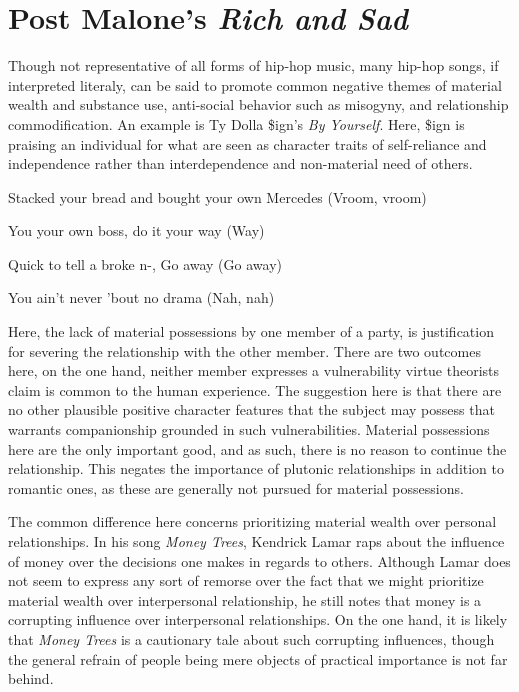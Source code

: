 \documentclass[phdthesis,12pt,final]{wuthesis}
\theoremstyle{definition}
\theoremstyle{definition}
\theoremstyle{definition}
\theoremstyle{definition}
\theoremstyle{remark}
\begin{document}
\section{\texorpdfstring{Post Malone's \emph{Rich and Sad}}{Post Malone's Rich and Sad}}\label{post-malones-rich-and-sad}

Though not representative of all forms of hip-hop music, many hip-hop songs, if interpreted literaly, can be said to promote common negative themes of material wealth and substance use, anti-social behavior such as misogyny, and relationship commodification. An example is Ty Dolla \$ign's \emph{By Yourself}. Here, \$ign is praising an individual for what are seen as character traits of self-reliance and independence rather than interdependence and non-material need of others.

Stacked your bread and bought your own Mercedes (Vroom, vroom)

You your own boss, do it your way (Way)

Quick to tell a broke n-, Go away (Go away)

You ain't never 'bout no drama (Nah, nah)

Here, the lack of material possessions by one member of a party, is justification for severing the relationship with the other member. There are two outcomes here, on the one hand, neither member expresses a vulnerability virtue theorists claim is common to the human experience. The suggestion here is that there are no other plausible positive character features that the subject may possess that warrants companionship grounded in such vulnerabilities. Material possessions here are the only important good, and as such, there is no reason to continue the relationship. This negates the importance of plutonic relationships in addition to romantic ones, as these are generally not pursued for material possessions.

The common difference here concerns prioritizing material wealth over personal relationships. In his song \emph{Money Trees}, Kendrick Lamar raps about the influence of money over the decisions one makes in regards to others. Although Lamar does not seem to express any sort of remorse over the fact that we might prioritize material wealth over interpersonal relationship, he still notes that money is a corrupting influence over interpersonal relationships. On the one hand, it is likely that \emph{Money Trees} is a cautionary tale about such corrupting influences, though the general refrain of people being mere objects of practical importance is not far behind.
\end{document}

